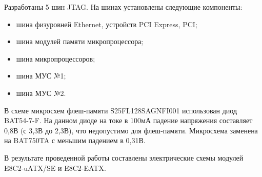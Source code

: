 Разработаны 5 шин JTAG. На шинах установлены следующие компоненты:
\begin{itemize}
	\item шина физуровней Ethernet, устройств PCI Express, PCI;
	\item шина модулей памяти микропроцессора;
	\item шина микропроцессоров;
	\item шина МУС №1;
	\item шина МУС №2.
\end{itemize}

В схеме микросхем флеш-памяти S25FL128SAGNFI001 использован диод BAT54-7-F. На данном диоде на токе в 100мА падение напряжения составляет 0,8В (с 3,3В до 2,3В), что недопустимо для флеш-памяти. Микросхема заменена на BAT750TA с меньшим падением в 0,31В.

В результате проведенной работы составлены электрические схемы модулей E8C2-uATX/SE и E8C2-EATX.

\clearpage
